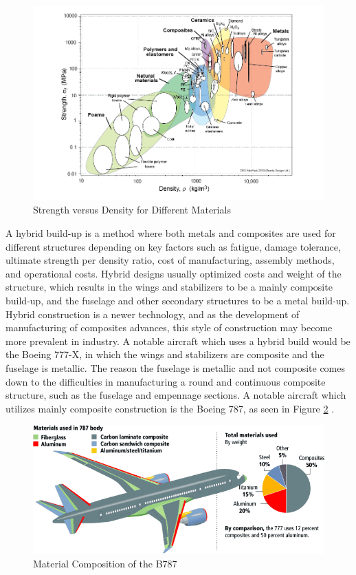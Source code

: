 \begin{figure}[!h]
    \centering
    \includegraphics[width=\linewidth]{Photos/strength_density.png}
    \caption{Strength versus Density for Different Materials}
    \label{fig:strength_density}
\end{figure}

A hybrid build-up is a method where both metals and composites are used for different structures depending on key factors such as fatigue, damage tolerance, ultimate strength per density ratio, cost of manufacturing, assembly methods, and operational costs. Hybrid designs usually optimized costs and weight of the structure, which results in the wings and stabilizers to be a mainly composite build-up, and the fuselage and other secondary structures to be a metal build-up. Hybrid construction is a newer technology, and as the development of manufacturing of composites advances, this style of construction may become more prevalent in industry. A notable aircraft which uses a hybrid build would be the Boeing 777-X, in which the wings and stabilizers are composite and the fuselage is metallic. The reason the fuselage is metallic and not composite comes down to the difficulties in manufacturing a round and continuous composite structure, such as the fuselage and empennage sections. A notable aircraft which utilizes mainly composite construction is the Boeing 787, as seen in Figure \ref{fig:787 materials} \cite{787_Mat}.

\begin{figure}[!h]
    \centering
    \includegraphics[width=\linewidth]{Photos/787 Materials.png}
    \caption{Material Composition of the B787}
    \label{fig:787 materials}
\end{figure}

